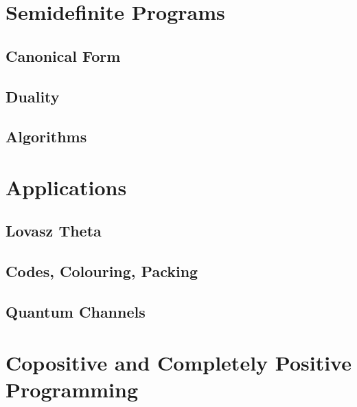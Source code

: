 \documentclass[letterpaper,11pt,oneside,onecolumn]{article}
\begin{document}
\section*{Semidefinite Programs}
\subsection*{Canonical Form}
\subsection*{Duality}
\subsection*{Algorithms}
\section*{Applications}
\subsection*{Lovasz Theta}
\subsection*{Codes, Colouring, Packing}
\subsection*{Quantum Channels}
\section*{Copositive and Completely Positive Programming}
\end{document}
